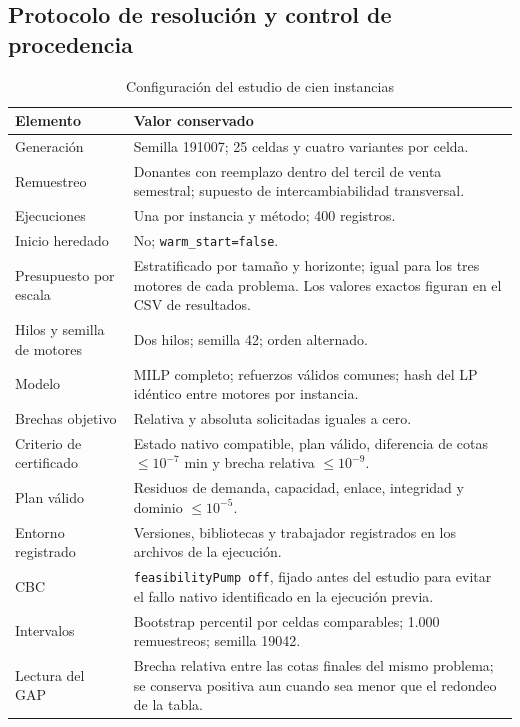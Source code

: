 \subsection{Protocolo de resolución y control de procedencia}\label{an:protocolo100}
\begin{table}[H]\centering\small
\caption{Configuración del estudio de cien instancias}\label{tab:protocolo100}
\begin{tabular}{p{48mm}p{103mm}}\toprule
Elemento & Valor conservado\\\midrule
Generación & Semilla 191007; 25 celdas y cuatro variantes por celda.\\
Remuestreo & Donantes con reemplazo dentro del tercil de venta semestral; supuesto de intercambiabilidad transversal.\\
Ejecuciones & Una por instancia y método; 400 registros.\\
Inicio heredado & No; \texttt{warm\_start=false}.\\
Presupuesto por escala & Estratificado por tamaño y horizonte; igual para los tres motores de cada problema. Los valores exactos figuran en el CSV de resultados.\\
Hilos y semilla de motores & Dos hilos; semilla 42; orden alternado.\\
Modelo & MILP completo; refuerzos válidos comunes; hash del LP idéntico entre motores por instancia.\\
Brechas objetivo & Relativa y absoluta solicitadas iguales a cero.\\
Criterio de certificado & Estado nativo compatible, plan válido, diferencia de cotas $\leq10^{-7}$ min y brecha relativa $\leq10^{-9}$.\\
Plan válido & Residuos de demanda, capacidad, enlace, integridad y dominio $\leq10^{-5}$.\\
Entorno registrado & Versiones, bibliotecas y trabajador registrados en los archivos de la ejecución.\\
CBC & \texttt{feasibilityPump off}, fijado antes del estudio para evitar el fallo nativo identificado en la ejecución previa.\\
Intervalos & Bootstrap percentil por celdas comparables; 1.000 remuestreos; semilla 19042.\\
Lectura del GAP & Brecha relativa entre las cotas finales del mismo problema; se conserva positiva aun cuando sea menor que el redondeo de la tabla.\\\bottomrule
\end{tabular}
\end{table}

